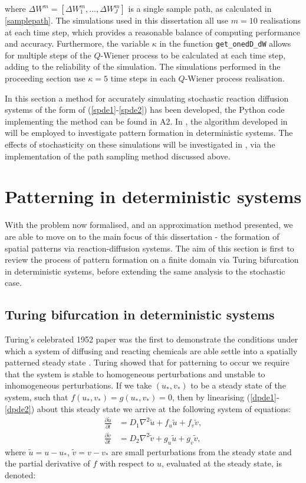 \documentclass[12pt]{article}
\begin{document}
where $\Delta W^m = \left[\Delta W^m_1,...,\Delta W^m_J\right]$ is a single sample path, as calculated in \eqref{samplepath}. The simulations used in this dissertation all use $m=10$ realisations at each time step, which provides a reasonable balance of computing performance and accuracy. Furthermore, the variable $\kappa$ in the function \texttt{get\_onedD\_dW} allows for multiple steps of the $Q$-Wiener process to be calculated at each time step, adding to the reliability of the simulation. The simulations performed in the proceeding section use $\kappa = 5$ time steps in each $Q$-Wiener process realisation.

In this section a method for accurately simulating stochastic reaction diffusion systems of the form of (\ref{spde1}-\ref{spde2}) has been developed, the Python code implementing the method can be found in A2. In , the algorithm developed in  will be employed to investigate pattern formation in deterministic systems. The effects of stochasticity on these simulations will be investigated in , via the implementation of the path sampling method discussed above.      

\section{Patterning in  deterministic systems}
With the problem now formalised, and an approximation method presented, we are able to move on to the main focus of this dissertation - the formation of spatial patterns via reaction-diffusion systems. The aim of this section is first to review the process of pattern formation on a finite domain via Turing bifurcation in deterministic systems, before extending the same analysis to the stochastic case.

 \subsection{Turing bifurcation in deterministic systems}
 Turing's celebrated 1952 paper was the first to demonstrate the conditions under which a system of diffusing and reacting chemicals are able settle into a spatially patterned steady state \cite{Turing}. Turing showed that for patterning to occur we require that the system is stable to homogeneous perturbations and unstable to inhomogeneous perturbations. If we take $(u_\ast, v_\ast)$ to be a steady state of the system, such that $f(u_\ast, v_\ast) = g(u_\ast, v_\ast) = 0$, then by linearising (\ref{dpde1}-\ref{dpde2}) about this steady state we arrive at the following system of equations:
\begin{align} \label{eq2}
     \frac{\partial{\tilde{u}}}{\partial{t}} &= D_1 \nabla^2 \tilde{u}+ f_u\tilde{u} + f_v\tilde{v}, \\
     \frac{\partial{\tilde{v}}}{\partial{t}} &= D_2 \nabla^2 \tilde{v}+ g_u\tilde{u} + g_v\tilde{v}, 
\end{align}
 where $\tilde{u} = u - u_\ast$, $\tilde{v} = v - v_\ast$ are small perturbations from the steady state and the partial derivative of $f$ with respect to $u$, evaluated at the steady state, is denoted:
 
\end{document}
